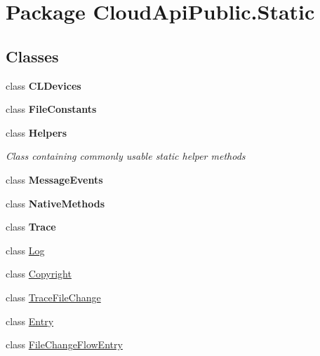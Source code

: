 \hypertarget{namespace_cloud_api_public_1_1_static}{\section{Package Cloud\-Api\-Public.\-Static}
\label{namespace_cloud_api_public_1_1_static}
}
\subsection*{Classes}
\begin{DoxyCompactItemize}
\item 
class {\bfseries C\-L\-Devices}
\item 
class {\bfseries File\-Constants}
\item 
class {\bfseries Helpers}
\begin{DoxyCompactList}\small\item\em Class containing commonly usable static helper methods \end{DoxyCompactList}\item 
class {\bfseries Message\-Events}
\item 
class {\bfseries Native\-Methods}
\item 
class {\bfseries Trace}
\item 
class \hyperlink{class_cloud_api_public_1_1_static_1_1_log}{Log}
\begin{DoxyCompactList}\small\item\em \end{DoxyCompactList}\item 
class \hyperlink{class_cloud_api_public_1_1_static_1_1_copyright}{Copyright}
\begin{DoxyCompactList}\small\item\em \end{DoxyCompactList}\item 
class \hyperlink{class_cloud_api_public_1_1_static_1_1_trace_file_change}{Trace\-File\-Change}
\begin{DoxyCompactList}\small\item\em \end{DoxyCompactList}\item 
class \hyperlink{class_cloud_api_public_1_1_static_1_1_entry}{Entry}
\begin{DoxyCompactList}\small\item\em \end{DoxyCompactList}\item 
class \hyperlink{class_cloud_api_public_1_1_static_1_1_file_change_flow_entry}{File\-Change\-Flow\-Entry}

\end{DoxyCompactItemize}
